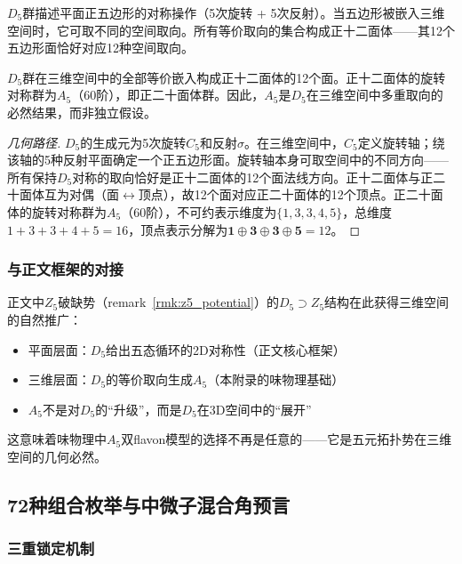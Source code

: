 $D_5$群描述平面正五边形的对称操作（5次旋转 + 5次反射）。当五边形被嵌入三维空间时，它可取不同的空间取向。所有等价取向的集合构成正十二面体——其12个五边形面恰好对应12种空间取向。

\begin{proposition}[$D_5$嵌入的闭合性]
\label{prop:d5_embed}
$D_5$群在三维空间中的全部等价嵌入构成正十二面体的12个面。正十二面体的旋转对称群为$A_5$（60阶），即正二十面体群。因此，$A_5$是$D_5$在三维空间中多重取向的必然结果，而非独立假设。
\end{proposition}

\begin{proof}[几何路径]
$D_5$的生成元为5次旋转$C_5$和反射$\sigma$。在三维空间中，$C_5$定义旋转轴；绕该轴的5种反射平面确定一个正五边形面。旋转轴本身可取空间中的不同方向——所有保持$D_5$对称的取向恰好是正十二面体的12个面法线方向。正十二面体与正二十面体互为对偶（面$\leftrightarrow$顶点），故12个面对应正二十面体的12个顶点。正二十面体的旋转对称群为$A_5$（60阶），不可约表示维度为$\{1,3,3,4,5\}$，总维度$1+3+3+4+5=16$，顶点表示分解为$\mathbf{1}\oplus\mathbf{3}\oplus\mathbf{3}\oplus\mathbf{5}=12$。
\end{proof}

\subsubsection{与正文框架的对接}

正文中$Z_5$破缺势（remark~\ref{rmk:z5_potential}）的$D_5 \supset Z_5$结构在此获得三维空间的自然推广：

\begin{itemize}
\item 平面层面：$D_5$给出五态循环的2D对称性（正文核心框架）
\item 三维层面：$D_5$的等价取向生成$A_5$（本附录的味物理基础）
\item $A_5$不是对$D_5$的``升级''，而是$D_5$在3D空间中的``展开''
\end{itemize}

这意味着味物理中$A_5$双flavon模型的选择不再是任意的——它是五元拓扑势在三维空间的几何必然。

\subsection{72种组合枚举与中微子混合角预言}
\label{subsec:72_combos}

\subsubsection{三重锁定机制}

